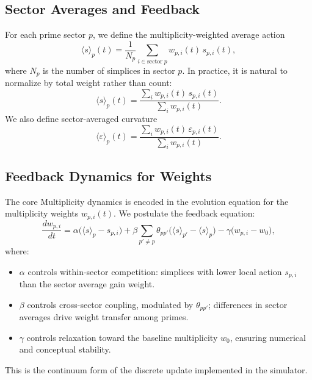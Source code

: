 \documentclass[11pt]{article}
\begin{document}
\subsection{Sector Averages and Feedback}

For each prime sector \(p\), we define the multiplicity-weighted average
action
\begin{equation}
  \langle s \rangle_p(t) =
    \frac{1}{N_p}
    \sum_{i \in \mathrm{sector}\;p}
      w_{p,i}(t)\,s_{p,i}(t),
\end{equation}
where \(N_p\) is the number of simplices in sector \(p\). In practice, it
is natural to normalize by total weight rather than count:
\begin{equation}
  \langle s \rangle_p(t) =
    \frac{
      \sum_{i} w_{p,i}(t)\,s_{p,i}(t)
    }{
      \sum_{i} w_{p,i}(t)
    }.
\end{equation}
We also define sector-averaged curvature
\begin{equation}
  \langle \varepsilon \rangle_p(t) =
    \frac{
      \sum_{i} w_{p,i}(t)\,\varepsilon_{p,i}(t)
    }{
      \sum_{i} w_{p,i}(t)
    }.
\end{equation}

\subsection{Feedback Dynamics for Weights}

The core Multiplicity dynamics is encoded in the evolution equation for
the multiplicity weights \(w_{p,i}(t)\). We postulate the feedback equation:
\begin{equation}
  \frac{d w_{p,i}}{dt}
    = \alpha\bigl(\langle s \rangle_p - s_{p,i}\bigr)
    + \beta \sum_{p' \neq p}
        \theta_{pp'}
        \bigl(\langle s \rangle_{p'} - \langle s \rangle_p \bigr)
    - \gamma \bigl(w_{p,i} - w_0\bigr),
  \label{eq:feedback-full}
\end{equation}
where:
\begin{itemize}
  \item \(\alpha\) controls within-sector competition: simplices with lower
        local action \(s_{p,i}\) than the sector average gain weight.
  \item \(\beta\) controls cross-sector coupling, modulated by
        \(\theta_{pp'}\); differences in sector averages drive weight
        transfer among primes.
  \item \(\gamma\) controls relaxation toward the baseline multiplicity
        \(w_0\), ensuring numerical and conceptual stability.
\end{itemize}
This is the continuum form of the discrete update implemented in the
simulator.
\end{document}
